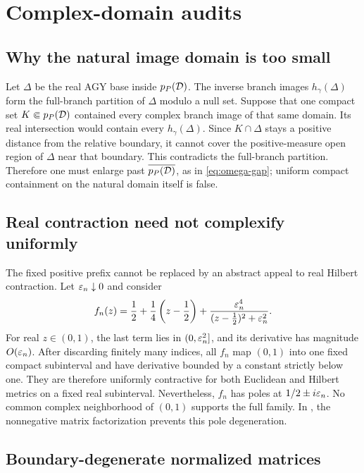 \section{Complex-domain audits}
\label{app:complex-proofs}

\subsection{Why the natural image domain is too small}

Let \(\Delta\) be the real AGY base inside \(p_P(\mathcal{D})\).  The inverse
branch images \(h_\gamma(\Delta)\) form the full-branch partition of
\(\Delta\) modulo a null set.  Suppose that one compact set
\(K\Subset p_P(\mathcal{D})\) contained every complex branch image of that same
domain.  Its real intersection would contain every
\(h_\gamma(\Delta)\).  Since \(K\cap\Delta\) stays a positive distance from
the relative boundary, it cannot cover the positive-measure open region of
\(\Delta\) near that boundary.  This contradicts the full-branch
partition.  Therefore one must enlarge past
\(\overline{p_P(\mathcal{D})}\), as in \eqref{eq:omega-gap}; uniform compact
containment on the natural domain itself is false.

\subsection{Real contraction need not complexify uniformly}

The fixed positive prefix cannot be replaced by an abstract appeal to real
Hilbert contraction.  Let \(\varepsilon_n\downarrow0\) and consider
\[
 f_n(z)=\frac12+\frac14\left(z-\frac12\right)
 +\frac{\varepsilon_n^4}{(z-\frac12)^2+\varepsilon_n^2}.
\]
For real \(z\in(0,1)\), the last term lies in \((0,\varepsilon_n^2]\), and its
derivative has magnitude \(O(\varepsilon_n)\).  After discarding finitely many
indices, all \(f_n\) map \((0,1)\) into one fixed compact subinterval and
have derivative bounded by a constant strictly below one.  They are
therefore uniformly contractive for both Euclidean and Hilbert metrics on a
fixed real subinterval.  Nevertheless, \(f_n\) has poles at
\(1/2\pm i\varepsilon_n\).  No common complex neighborhood of \((0,1)\) supports
the full family.  In , the nonnegative matrix
factorization prevents this pole degeneration.

\subsection{Boundary-degenerate normalized matrices}

